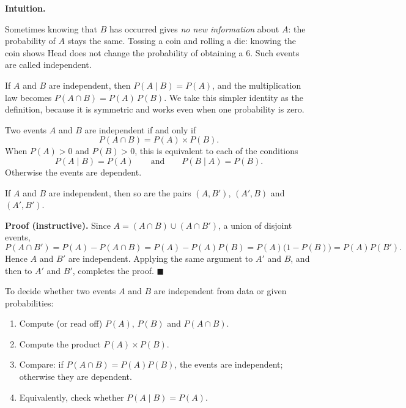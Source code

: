 \documentclass[11pt]{article}
\newcommand{\cle}[1]{{\popxbold\color{popdark}#1}}
\newcounter{popsec}
\newcounter{popsub}
\newcommand{\courssub}[1]{%
  \stepcounter{popsub}%
  \par\vspace{9pt}\noindent{\popxbold\fontsize{11.5}{13}\selectfont\color{popink}{\color{poporange}\thepopsec.\thepopsub}\hspace{6pt}#1}\par\nopagebreak\vspace{4pt}
}
\begin{document}
\courssub{Independent Events}

\textbf{Intuition.}\par
Sometimes knowing that $B$ has occurred gives \emph{no new information} about $A$: the probability of $A$ stays the same. Tossing a coin and rolling a die: knowing the coin shows Head does not change the probability of obtaining a $6$. Such events are called \cle{independent}.

If $A$ and $B$ are independent, then $P(A\mid B)=P(A)$, and the multiplication law becomes $P(A\cap B)=P(A)\,P(B)$. We take this simpler identity as the definition, because it is symmetric and works even when one probability is zero.

\begin{definition}
Two events $A$ and $B$ are \cle{independent} if and only if
\[
P(A\cap B)=P(A)\times P(B).
\]
When $P(A)>0$ and $P(B)>0$, this is equivalent to each of the conditions
\[
P(A\mid B)=P(A)\qquad\text{and}\qquad P(B\mid A)=P(B).
\]
Otherwise the events are \cle{dependent}.
\end{definition}

\begin{propriete}
If $A$ and $B$ are independent, then so are the pairs $(A,B')$, $(A',B)$ and $(A',B')$.
\end{propriete}

\textbf{Proof (instructive).} Since $A=(A\cap B)\cup(A\cap B')$, a union of disjoint events,
\[
P(A\cap B')=P(A)-P(A\cap B)=P(A)-P(A)P(B)=P(A)\bigl(1-P(B)\bigr)=P(A)P(B').
\]
Hence $A$ and $B'$ are independent. Applying the same argument to $A'$ and $B$, and then to $A'$ and $B'$, completes the proof. \hfill$\blacksquare$

\begin{methode}
To decide whether two events $A$ and $B$ are independent from data or given probabilities:
\begin{enumerate}
\item Compute (or read off) $P(A)$, $P(B)$ and $P(A\cap B)$.
\item Compute the product $P(A)\times P(B)$.
\item Compare: if $P(A\cap B)=P(A)P(B)$, the events are independent; otherwise they are dependent.
\item Equivalently, check whether $P(A\mid B)=P(A)$.
\end{enumerate}
\end{methode}
\end{document}
